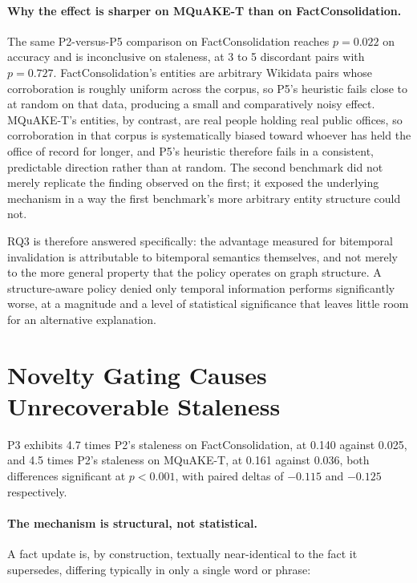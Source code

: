 \paragraph{Why the effect is sharper on MQuAKE-T than on FactConsolidation.} The same P2-versus-P5 comparison on FactConsolidation reaches $p = 0.022$ on accuracy and is inconclusive on staleness, at 3 to 5 discordant pairs with $p = 0.727$. FactConsolidation's entities are arbitrary Wikidata pairs whose corroboration is roughly uniform across the corpus, so P5's heuristic fails close to at random on that data, producing a small and comparatively noisy effect. MQuAKE-T's entities, by contrast, are real people holding real public offices, so corroboration in that corpus is systematically biased toward whoever has held the office of record for longer, and P5's heuristic therefore fails in a consistent, predictable direction rather than at random. The second benchmark did not merely replicate the finding observed on the first; it exposed the underlying mechanism in a way the first benchmark's more arbitrary entity structure could not.

RQ3 is therefore answered specifically: the advantage measured for bitemporal invalidation is attributable to bitemporal semantics themselves, and not merely to the more general property that the policy operates on graph structure. A structure-aware policy denied only temporal information performs significantly worse, at a magnitude and a level of statistical significance that leaves little room for an alternative explanation.

\section{Novelty Gating Causes Unrecoverable Staleness}
\label{sec:novelty-gating-results}

P3 exhibits 4.7 times P2's staleness on FactConsolidation, at 0.140 against 0.025, and 4.5 times P2's staleness on MQuAKE-T, at 0.161 against 0.036, both differences significant at $p < 0.001$, with paired deltas of $-0.115$ and $-0.125$ respectively.

\paragraph{The mechanism is structural, not statistical.} A fact update is, by construction, textually near-identical to the fact it supersedes, differing typically in only a single word or phrase:

